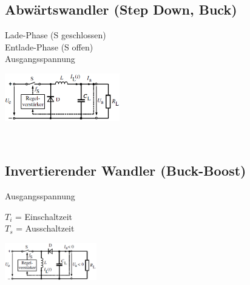         \subsection{Abw\"artswandler (Step Down, Buck)}
        \begin{minipage}[T]{14cm}
            Lade-Phase (S geschlossen)
            \hspace{0.5mm}\\  
            Entlade-Phase (S offen)
            \hspace{5.8mm}\\
            Ausgangsspannung
            \hspace{13mm}\\
        \end{minipage}
        \begin{minipage}{5cm}
            \includegraphics[width=5cm]{./bilder/ReglerStepDown.png}
        \end{minipage}\\
        
        \subsection{Invertierender Wandler (Buck-Boost)}
        \begin{minipage}[T]{8cm}
            Ausgangsspannung
            \hspace{13mm}\\
        \end{minipage}
        \begin{minipage}{6cm}
            $T_i$ = Einschaltzeit\\
            $T_s$ = Ausschaltzeit
        \end{minipage}
        \begin{minipage}{5cm}
            \includegraphics[width=4cm]{./bilder/ReglerInvert.png}
        \end{minipage}\\
        
